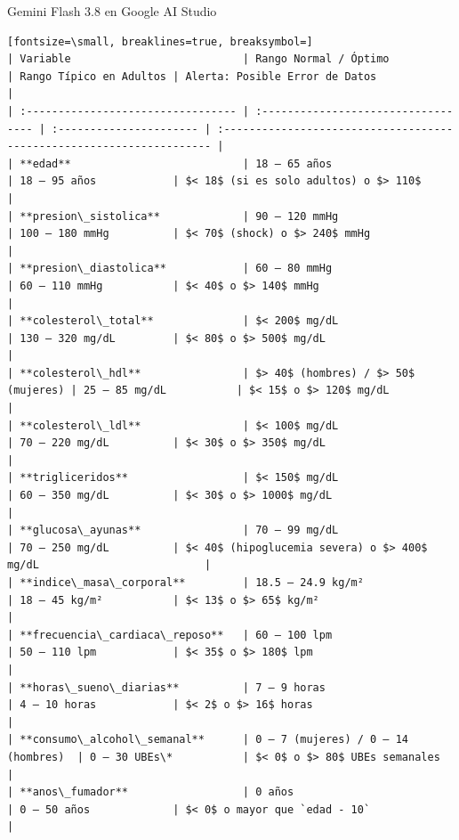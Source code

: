 \documentclass[12pt,a4paper,oneside]{book}
\begin{document}
\begin{iaresp}{Gemini Flash 3.8 en Google AI Studio}
\begin{Verbatim}[fontsize=\small, breaklines=true, breaksymbol=]
| Variable                           | Rango Normal / Óptimo               | Rango Típico en Adultos | Alerta: Posible Error de Datos                                        |
| :--------------------------------- | :---------------------------------- | :---------------------- | :-------------------------------------------------------------------- |
| **edad**                           | 18 – 65 años                        | 18 – 95 años            | $< 18$ (si es solo adultos) o $> 110$                                 |
| **presion\_sistolica**             | 90 – 120 mmHg                       | 100 – 180 mmHg          | $< 70$ (shock) o $> 240$ mmHg                                         |
| **presion\_diastolica**            | 60 – 80 mmHg                        | 60 – 110 mmHg           | $< 40$ o $> 140$ mmHg                                                 |
| **colesterol\_total**              | $< 200$ mg/dL                       | 130 – 320 mg/dL         | $< 80$ o $> 500$ mg/dL                                                |
| **colesterol\_hdl**                | $> 40$ (hombres) / $> 50$ (mujeres) | 25 – 85 mg/dL           | $< 15$ o $> 120$ mg/dL                                                |
| **colesterol\_ldl**                | $< 100$ mg/dL                       | 70 – 220 mg/dL          | $< 30$ o $> 350$ mg/dL                                                |
| **trigliceridos**                  | $< 150$ mg/dL                       | 60 – 350 mg/dL          | $< 30$ o $> 1000$ mg/dL                                               |
| **glucosa\_ayunas**                | 70 – 99 mg/dL                       | 70 – 250 mg/dL          | $< 40$ (hipoglucemia severa) o $> 400$ mg/dL                          |
| **indice\_masa\_corporal**         | 18.5 – 24.9 kg/m²                   | 18 – 45 kg/m²           | $< 13$ o $> 65$ kg/m²                                                 |
| **frecuencia\_cardiaca\_reposo**   | 60 – 100 lpm                        | 50 – 110 lpm            | $< 35$ o $> 180$ lpm                                                  |
| **horas\_sueno\_diarias**          | 7 – 9 horas                         | 4 – 10 horas            | $< 2$ o $> 16$ horas                                                  |
| **consumo\_alcohol\_semanal**      | 0 – 7 (mujeres) / 0 – 14 (hombres)  | 0 – 30 UBEs\*           | $< 0$ o $> 80$ UBEs semanales                                         |
| **anos\_fumador**                  | 0 años                              | 0 – 50 años             | $< 0$ o mayor que `edad - 10`                                         |

\end{Verbatim}
\end{iaresp}
\end{document}
